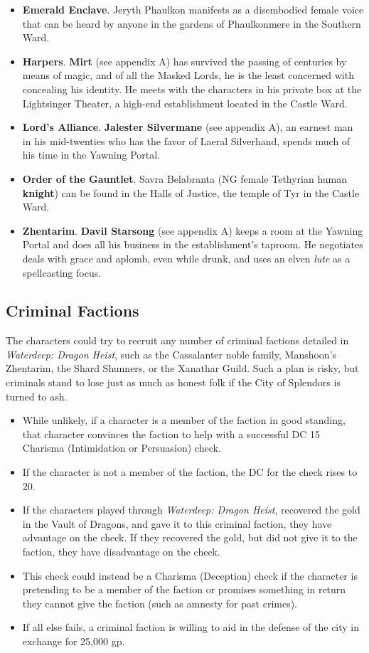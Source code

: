 \documentclass[10pt,a4paper,twoside,bg=print,twocolumn,openany,nodeprecatedcode]{dndbook}
\begin{document}
\begin{itemize}
\item \textbf{Emerald Enclave}. Jeryth Phaulkon manifests as a disembodied female voice that can be heard by anyone in the gardens of Phaulkonmere in the Southern Ward.
\item \textbf{Harpers}. \textbf{Mirt} (see appendix A) has survived the passing of centuries by means of magic, and of all the Masked Lords, he is the least concerned with concealing his identity. He meets with the characters in his private box at the Lightsinger Theater, a high-end establishment located in the Castle Ward.
\item \textbf{Lord's Alliance}. \textbf{Jalester Silvermane} (see appendix A), an earnest man in his mid-twenties who has the favor of Laeral Silverhand, spends much of his time in the Yawning Portal.
\item \textbf{Order of the Gauntlet}. Savra Belabranta (NG female Tethyrian human \textbf{knight}) can be found in the Halls of Justice, the temple of Tyr in the Castle Ward.
\item \textbf{Zhentarim}. \textbf{Davil Starsong} (see appendix A) keeps a room at the Yawning Portal and does all his business in the establishment's taproom. He negotiates deals with grace and aplomb, even while drunk, and uses an elven \textit{lute} as a spellcasting focus.
\end{itemize}

\subsection{Criminal Factions}
The characters could try to recruit any number of criminal factions detailed in \textit{Waterdeep: Dragon Heist}, such as the Cassalanter noble family, Manshoon's Zhentarim, the Shard Shunners, or the Xanathar Guild. Such a plan is risky, but criminals stand to lose just as much as honest folk if the City of Splendors is turned to ash.


\begin{itemize}
\item While unlikely, if a character is a member of the faction in good standing, that character convinces the faction to help with a successful DC 15 Charisma (Intimidation or Persuasion) check.
\item If the character is not a member of the faction, the DC for the check rises to 20.
\item If the characters played through \textit{Waterdeep: Dragon Heist}, recovered the gold in the Vault of Dragons, and gave it to this criminal faction, they have advantage on the check. If they recovered the gold, but did not give it to the faction, they have disadvantage on the check.
\item This check could instead be a Charisma (Deception) check if the character is pretending to be a member of the faction or promises something in return they cannot give the faction (such as amnesty for past crimes).
\item If all else fails, a criminal faction is willing to aid in the defense of the city in exchange for 25,000 gp.
\end{itemize}
\end{document}
